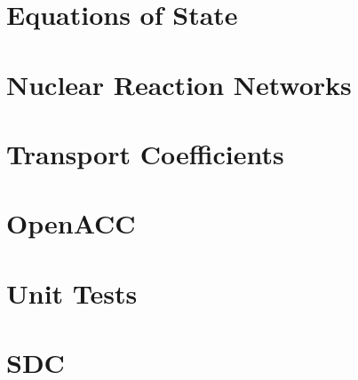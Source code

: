 \documentclass[11pt]{book}
\begin{document}



\chapter{Equations of State}
\label{chapter:eos}




\chapter{Nuclear Reaction Networks}
\label{chapter:networks}




\chapter{Transport Coefficients}
\label{chapter:transport}




\chapter{OpenACC}
\label{chapter:openacc}




\chapter{Unit Tests}



\graphicspath{{burn_cell/}}


\chapter{SDC}




\backmatter

\renewcommand\bibname{References}


\end{document}
